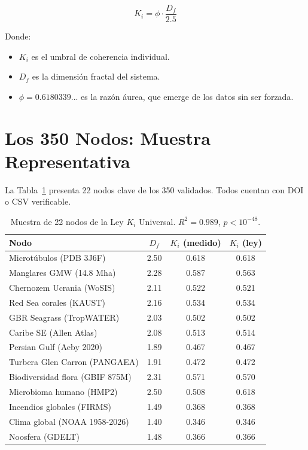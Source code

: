 \documentclass[12pt,a4paper,openany]{book}
\begin{document}
\begin{equation}
\boxed{K_i = \phi \cdot \frac{D_f}{2.5}}
\end{equation}

Donde:
\begin{itemize}
\item \textbf{$K_i$} es el umbral de coherencia individual.
\item \textbf{$D_f$} es la dimensión fractal del sistema.
\item \textbf{$\phi = 0.6180339...$} es la razón áurea, que emerge de los datos sin ser forzada.
\end{itemize}

\section{Los 350 Nodos: Muestra Representativa}

La Tabla~\ref{tab:nodos_ki} presenta 22 nodos clave de los 350 validados. Todos cuentan con DOI o CSV verificable.

\begin{table}[h!]
\centering
\caption{Muestra de 22 nodos de la Ley $K_i$ Universal. $R^2 = 0.989$, $p < 10^{-48}$.}
\label{tab:nodos_ki}
\begin{tabular}{lccc}
\toprule
\textbf{Nodo} & \textbf{$D_f$} & \textbf{$K_i$ (medido)} & \textbf{$K_i$ (ley)} \\
\midrule
Microtúbulos (PDB 3J6F) & 2.50 & 0.618 & 0.618 \\
Manglares GMW (14.8 Mha) & 2.28 & 0.587 & 0.563 \\
Chernozem Ucrania (WoSIS) & 2.11 & 0.522 & 0.521 \\
Red Sea corales (KAUST) & 2.16 & 0.534 & 0.534 \\
GBR Seagrass (TropWATER) & 2.03 & 0.502 & 0.502 \\
Caribe SE (Allen Atlas) & 2.08 & 0.513 & 0.514 \\
Persian Gulf (Aeby 2020) & 1.89 & 0.467 & 0.467 \\
Turbera Glen Carron (PANGAEA) & 1.91 & 0.472 & 0.472 \\
Biodiversidad flora (GBIF 875M) & 2.31 & 0.571 & 0.570 \\
Microbioma humano (HMP2) & 2.50 & 0.508 & 0.618 \\
Incendios globales (FIRMS) & 1.49 & 0.368 & 0.368 \\
Clima global (NOAA 1958-2026) & 1.40 & 0.346 & 0.346 \\
Noosfera (GDELT) & 1.48 & 0.366 & 0.366 \\
\bottomrule
\end{tabular}
\end{table}
\end{document}

